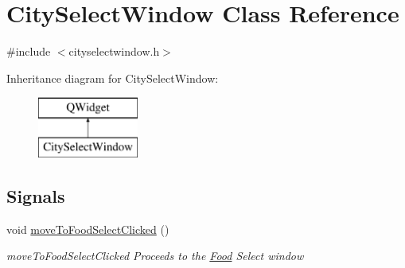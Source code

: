 \hypertarget{class_city_select_window}{}\section{City\+Select\+Window Class Reference}
\label{class_city_select_window}


{\ttfamily \#include $<$cityselectwindow.\+h$>$}

Inheritance diagram for City\+Select\+Window\+:\begin{figure}[H]
\begin{center}
\leavevmode
\includegraphics[height=2.000000cm]{class_city_select_window}
\end{center}
\end{figure}
\subsection*{Signals}
\begin{DoxyCompactItemize}
\item 
void \mbox{\hyperlink{class_city_select_window_a6181200e04334e668f39df57af243fff}{move\+To\+Food\+Select\+Clicked}} ()
\begin{DoxyCompactList}\small\item\em move\+To\+Food\+Select\+Clicked Proceeds to the \mbox{\hyperlink{class_food}{Food}} Select window \end{DoxyCompactList}\end{DoxyCompactItemize}
